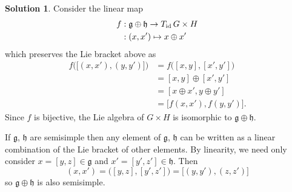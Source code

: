 \documentclass[11pt, a4paper]{report}
\theoremstyle{definition}
\newtheorem{solution}{Solution}[part]
\newenvironment{sol}{\begin{solution}}{\end{solution}\pagebreak[3]}
\newcommand*{\op}[1]{\ensuremath\mathop{}\mathopen{}#1}
\newcommand*{\id}{\op{\mathrm{id}}}
\begin{document}
\begin{sol}
Consider the linear map
\begin{align*}
    f &: \mathfrak{g} \oplus \mathfrak{h} \to T_{\id}\, G \times H \\
      &: (x, x') \mapsto x \oplus x'
\end{align*}
which preserves the Lie bracket above as
\begin{align*}
    f \bigl( \bigl[(x, x'), (y, y') \bigr] \bigr)
        &= f \bigl( [x, y], [x'\!, y'] \bigr) \\
        &= [x, y] \oplus [x'\!, y'] \\
        &= [x \oplus x', y \oplus y'] \\
        &= \bigl[ f(x, x'), f(y, y') \bigr].
\end{align*}
Since $f$ is bijective, the Lie algebra of $G \times H$ is isomorphic to $\mathfrak{g} \oplus \mathfrak{h}$.

If $\mathfrak{g}$, $\mathfrak{h}$ are semisimple then any element of $\mathfrak{g}$, $\mathfrak{h}$ can be written as a linear combination of the Lie bracket of other elements.
By linearity, we need only consider $x = [y, z] \in \mathfrak{g}$ and $x' = [y', z'] \in \mathfrak{h}$.
Then
\[
    (x, x') = \bigl( [y, z], [y', z'] )
            = \bigl[ (y, y'), (z, z') \bigr]
\]
so $\mathfrak{g} \oplus \mathfrak{h}$ is also semisimple.

\end{sol}
\end{document}
